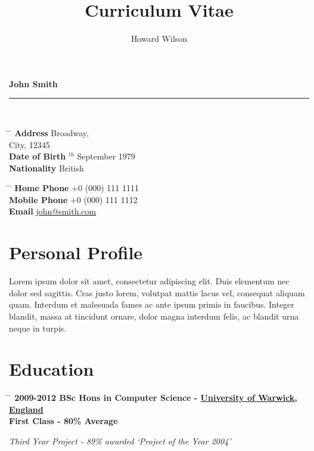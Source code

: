 \documentclass{article}
\title{Curriculum Vitae}
\author{Howard Wilson}
\begin{document}
{\huge{\color{slateblue}\textbf{John Smith}}}\\
\rule{\textwidth}{0.5mm}\\


\parbox{0.5\textwidth}{
\begin{tabbing}
\hspace{3cm} \= \hspace{4cm} \= \kill
{\bf Address}  Broadway,\\
\> City, 12345 \\
{\bf Date of Birth} $^{th}$ September 1979 \\
{\bf Nationality} \> British
\end{tabbing}
}\hfil\parbox{0.5\textwidth}{
\begin{tabbing}
\hspace{3cm} \= \hspace{4cm} \= \kill
{\bf Home Phone} \> +0 (000) 111 1111 \\
{\bf Mobile Phone} \> +0 (000) 111 1112 \\
{\bf Email} \> \href{mailto:john@smith.com}{john@smith.com} \\
\end{tabbing}
}


\section*{Personal Profile}

Lorem ipsum dolor sit amet, consectetur adipiscing elit. Duis elementum nec dolor sed sagittis. Cras justo lorem, volutpat mattis lacus vel, consequat aliquam quam. Interdum et malesuada fames ac ante ipsum primis in faucibus. Integer blandit, massa at tincidunt ornare, dolor magna interdum felis, ac blandit urna neque in turpis.


\section*{Education}

\begin{tabbing}
\hspace{2cm} \= \hspace{4cm} \= \kill
\bf{2009-2012} \> BSc Hons in Computer Science - \href{http://www.warwick.ac.uk}{University of Warwick, England} \\
\>First Class - 80\% Average\\
\rule{0mm}{5mm}\>\+
\textit{Third Year Project - 89\% awarded `Project of the Year 2004'}
\end{tabbing}
\end{document}
